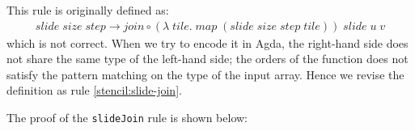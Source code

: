 \documentclass{l4proj}
\begin{document}
This rule is originally defined as: 
\begin{align*}
    \label{stencil:slide-join-original}
    slide\; size\; step \to join \circ (\lambda\; tile.\; map\; (slide\; size\; step\; tile))\; slide\; u\; v 
\end{align*}
which is not correct. When we try to encode it in Agda, the right-hand side does not share the same type of the left-hand side; the orders of the function does not satisfy the pattern matching on the type of the input array. Hence we revise the definition as rule \ref{stencil:slide-join}.

The proof of the \texttt{slideJoin} rule is shown below:
\begin{code}%
\>[0]\AgdaSpace{}%
\AgdaSymbol{:}%
\>[681I]\AgdaSymbol{\{}\AgdaSpace{}%
\AgdaSpace{}%
\AgdaSymbol{:}\AgdaSpace{}%
\AgdaSymbol{\}}\AgdaSpace{}%
\AgdaSpace{}%
\AgdaSymbol{\{}\AgdaSpace{}%
\AgdaSymbol{:}\AgdaSpace{}%
\AgdaSymbol{\}}\AgdaSpace{}%
\AgdaSpace{}%
\AgdaSymbol{(}\AgdaSpace{}%
\AgdaSymbol{:}\AgdaSpace{}%
\AgdaSymbol{)}\AgdaSpace{}%
\AgdaSpace{}%
\AgdaSymbol{(}\AgdaSpace{}%
\AgdaSymbol{:}\AgdaSpace{}%
\AgdaSymbol{)}\AgdaSpace{}%
\<%
\\
\>[.][@{}l@{}]\<[681I]%
\>[12]\AgdaSymbol{(}\AgdaSpace{}%
\AgdaSymbol{:}\AgdaSpace{}%
\AgdaSpace{}%
\AgdaSpace{}%
\AgdaSymbol{(}\AgdaSpace{}%
\AgdaOperator{\AgdaPrimitive{+}}\AgdaSpace{}%
\AgdaSpace{}%
\AgdaOperator{\AgdaPrimitive{*}}\AgdaSpace{}%
\AgdaSymbol{(}\AgdaSpace{}%
\AgdaSymbol{)}\AgdaSpace{}%
\AgdaOperator{\AgdaPrimitive{+}}\AgdaSpace{}%
\AgdaSpace{}%
\AgdaOperator{\AgdaPrimitive{*}}\AgdaSpace{}%
\AgdaSpace{}%
\AgdaSymbol{(}\AgdaSpace{}%
\AgdaOperator{\AgdaPrimitive{+}}\AgdaSpace{}%
\AgdaSpace{}%
\AgdaOperator{\AgdaPrimitive{+}}\AgdaSpace{}%
\AgdaSpace{}%
\AgdaOperator{\AgdaPrimitive{*}}\AgdaSpace{}%
\AgdaSymbol{)))}\AgdaSpace{}%
\<%
\\
\>[0][@{}l@{\AgdaIndent{0}}]%
\>[2]\AgdaSpace{}%
\AgdaSymbol{(}\AgdaSpace{}%
\AgdaSpace{}%
\AgdaSymbol{(}\AgdaSpace{}%
\AgdaSymbol{:}\AgdaSpace{}%
\AgdaSpace{}%

\end{code}
\end{document}
